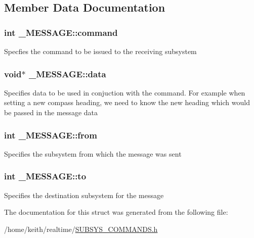 \subsection{Member Data Documentation}
\hypertarget{struct__MESSAGE_a4d7f2b7e82139f257e40d456e56bd8ab}{
\subsubsection[{command}]{\setlength{\rightskip}{0pt plus 5cm}int \-\_\-\-M\-E\-S\-S\-A\-G\-E\-::command}}\label{struct__MESSAGE_a4d7f2b7e82139f257e40d456e56bd8ab}
Specfies the command to be issued to the receiving subsystem \hypertarget{struct__MESSAGE_a53f90bcdb7c1d0ee7bb242aed3c120a7}{
\subsubsection[{data}]{\setlength{\rightskip}{0pt plus 5cm}void$\ast$ \-\_\-\-M\-E\-S\-S\-A\-G\-E\-::data}}\label{struct__MESSAGE_a53f90bcdb7c1d0ee7bb242aed3c120a7}
Specifies data to be used in conjuction with the command. For example when setting a new compass heading, we need to know the new heading which would be passed in the message data \hypertarget{struct__MESSAGE_ae5e8b5fe34c20f30b5bfb8d10f69ecfd}{
\subsubsection[{from}]{\setlength{\rightskip}{0pt plus 5cm}int \-\_\-\-M\-E\-S\-S\-A\-G\-E\-::from}}\label{struct__MESSAGE_ae5e8b5fe34c20f30b5bfb8d10f69ecfd}
Specifies the subsystem from which the message was sent \hypertarget{struct__MESSAGE_ac270d2c13a196e8440f1a074e0ac7560}{
\subsubsection[{to}]{\setlength{\rightskip}{0pt plus 5cm}int \-\_\-\-M\-E\-S\-S\-A\-G\-E\-::to}}\label{struct__MESSAGE_ac270d2c13a196e8440f1a074e0ac7560}
Specifies the destination subsystem for the message 

The documentation for this struct was generated from the following file\-:\begin{DoxyCompactItemize}
\item 
/home/keith/realtime/\hyperlink{SUBSYS__COMMANDS_8h}{S\-U\-B\-S\-Y\-S\-\_\-\-C\-O\-M\-M\-A\-N\-D\-S.\-h}\end{DoxyCompactItemize}
